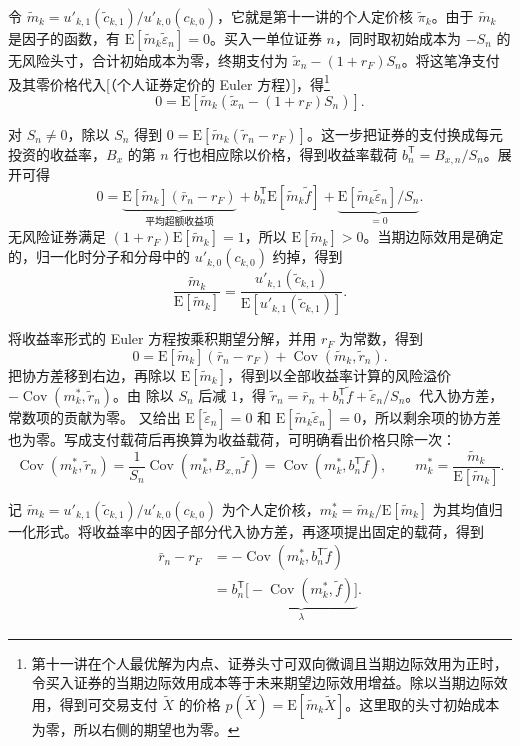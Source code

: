 \begin{solution}[label-content={证明},blank-type=none]
令 $\widetilde m_k=u'_{k,1}(\widetilde c_{k,1})/u'_{k,0}(c_{k,0})$，它就是第十一讲的个人定价核 $\widetilde\pi_k$。由于 $\widetilde m_k$ 是因子的函数，有 $\mathrm E[\widetilde m_k\widetilde\varepsilon_n]=0$。买入一单位证券 $n$，同时取初始成本为 $-S_n$ 的无风险头寸，合计初始成本为零，终期支付为 $\widetilde x_n-(1+r_F)S_n$。将这笔净支付及其零价格代入[（个人证券定价的 Euler 方程）]，得\footnote{第十一讲在个人最优解为内点、证券头寸可双向微调且当期边际效用为正时，令买入证券的当期边际效用成本等于未来期望边际效用增益。除以当期边际效用，得到可交易支付 $\widetilde X$ 的价格 $p(\widetilde X)=\mathrm E[\widetilde m_k\widetilde X]$。这里取的头寸初始成本为零，所以右侧的期望也为零。}
\[
 0=\mathrm E[\widetilde m_k(\widetilde x_n-(1+r_F)S_n)].
\]

对 $S_n\ne0$，除以 $S_n$ 得到 $0=\mathrm E[\widetilde m_k(\widetilde r_n-r_F)]$。这一步把证券的支付换成每元投资的收益率，$B_x$ 的第 $n$ 行也相应除以价格，得到收益率载荷 $b_n^{\mathsf T}=B_{x,n}/S_n$。展开可得
\[
 0=\underbrace{\mathrm E[\widetilde m_k](\bar r_n-r_F)}_{\text{平均超额收益项}}
 +b_n^{\mathsf T}\mathrm E[\widetilde m_k\widetilde f]
 +\underbrace{\mathrm E[\widetilde m_k\widetilde\varepsilon_n]/S_n}_{=0}.
\]
无风险证券满足 $(1+r_F)\mathrm E[\widetilde m_k]=1$，所以 $\mathrm E[\widetilde m_k]>0$。当期边际效用是确定的，归一化时分子和分母中的 $u'_{k,0}(c_{k,0})$ 约掉，得到
\[
 \frac{\widetilde m_k}{\mathrm E[\widetilde m_k]}
 =\frac{u'_{k,1}(\widetilde c_{k,1})}{\mathrm E[u'_{k,1}(\widetilde c_{k,1})]}.
\]

将收益率形式的 Euler 方程按乘积期望分解，并用 $r_F$ 为常数，得到
\[
 0=\mathrm E[\widetilde m_k](\bar r_n-r_F)
    +\operatorname{Cov}(\widetilde m_k,\widetilde r_n).
\]
把协方差移到右边，再除以 $\mathrm E[\widetilde m_k]$，得到以全部收益率计算的风险溢价 $-\operatorname{Cov}(m_k^*,\widetilde r_n)$。由 除以 $S_n$ 后减 $1$，得 $\widetilde r_n=\bar r_n+b_n^{\mathsf T}\widetilde f+\widetilde\varepsilon_n/S_n$。代入协方差，常数项的贡献为零。 又给出 $\mathrm E[\widetilde\varepsilon_n]=0$ 和 $\mathrm E[\widetilde m_k\widetilde\varepsilon_n]=0$，所以剩余项的协方差也为零。写成支付载荷后再换算为收益载荷，可明确看出价格只除一次：
\[
 \operatorname{Cov}(m_k^*,\widetilde r_n)
 =\frac{1}{S_n}\operatorname{Cov}(m_k^*,B_{x,n}\widetilde f)
 =\operatorname{Cov}(m_k^*,b_n^{\mathsf T}\widetilde f),
 \qquad m_k^*=\frac{\widetilde m_k}{\mathrm E[\widetilde m_k]}.
\]
\end{solution}

记 $\widetilde m_k=u'_{k,1}(\widetilde c_{k,1})/u'_{k,0}(c_{k,0})$ 为个人定价核，$m_k^*=\widetilde m_k/\mathrm E[\widetilde m_k]$ 为其均值归一化形式。将收益率中的因子部分代入协方差，再逐项提出固定的载荷，得到
\begin{equation}
 \begin{aligned}
 \bar r_n-r_F&=-\operatorname{Cov}(m_k^*,b_n^{\mathsf T}\widetilde f)\\
 &=b_n^{\mathsf T}\underbrace{\bigl[-\operatorname{Cov}(m_k^*,\widetilde f)\bigr]}_{\lambda}.
 \end{aligned}
 \label{eq:wj-14-8}
\end{equation}

